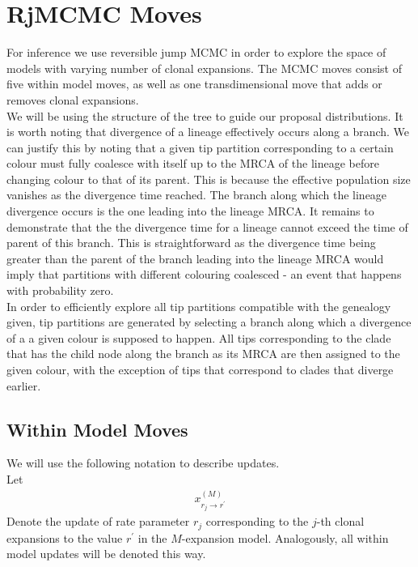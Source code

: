 \documentclass{report}
\theoremstyle{definition}
\begin{document}
\section{RjMCMC Moves}
For inference we use reversible jump MCMC in order to explore the space of models with varying number of clonal expansions.
The MCMC moves consist of five within model moves, as well as one transdimensional move that adds or removes clonal expansions.\\
We will be using the structure of the tree to guide our proposal distributions. It is worth noting that divergence of a lineage effectively occurs along a branch. We can justify this by noting that a given tip partition corresponding to a certain colour must fully coalesce with itself up to the MRCA of the lineage before changing colour to that of its parent. This is because the effective population size vanishes as the divergence time reached.
The branch along which the lineage divergence occurs is the one leading into the lineage MRCA. It remains to demonstrate that the the divergence time for a lineage cannot exceed the time of parent of this branch. This is straightforward as the divergence time being greater than the parent of the branch leading into the lineage MRCA would imply that partitions with different colouring coalesced - an event that happens with probability zero.\\
In order to efficiently explore all tip partitions compatible with the genealogy given, tip partitions are generated by selecting a branch along which a divergence of a a given colour is supposed to happen. All tips corresponding to the clade that has the child node along the branch as its MRCA are then assigned to the given colour, with the exception of tips that correspond to clades that diverge earlier. 
\subsection{Within Model Moves}
We will use the following notation to describe updates.\\ Let 
\begin{gather}
x^{(M)}_{r_j\to r^{'}}
\end{gather}
Denote the update of rate parameter $r_j$ corresponding to the $j$-th clonal expansions to the value $r^{'}$ in the $M$-expansion model. Analogously, all within model updates will be denoted this way.\\
\end{document}
